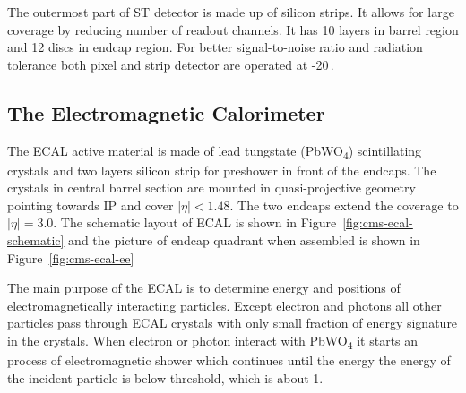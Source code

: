 The outermost part of \gls{ST} detector is made up of silicon strips. It allows for large
coverage by reducing number of readout channels. It has 10 layers in barrel region
and 12 discs in endcap region. For better signal-to-noise ratio and radiation
tolerance both pixel and strip detector are operated at -20\,\de{}\xspace.

\subsection{
  The Electromagnetic Calorimeter
}

The \gls{ECAL} active material is made of lead tungstate (PbWO\textsubscript{4})
scintillating crystals and two layers silicon strip for preshower
in front of the endcaps. The crystals in central barrel section are mounted
in quasi-projective geometry pointing towards \gls{IP} and cover
\( |\eta| < 1.48 \). The two endcaps extend the coverage to
\( |\eta| = 3.0 \). The schematic layout of \gls{ECAL} is shown in Figure~\ref{fig:cms-ecal-schematic}
and the picture of endcap quadrant when assembled is shown in Figure~\ref{fig:cms-ecal-ee}

The main purpose of the \gls{ECAL} is to determine energy and positions of
electromagnetically interacting particles.
Except electron and photons all other particles pass
through \gls{ECAL} crystals with only small fraction of energy signature in the crystals.
When electron or photon interact with PbWO\textsubscript{4} it starts an process
of electromagnetic shower which continues until the energy the energy of the incident
particle is below threshold, which is about 1\MeV{}.


